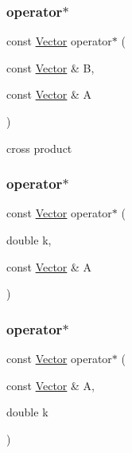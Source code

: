 \subsubsection{\texorpdfstring{operator$\ast$}{operator*}\hspace{0.1cm}{\footnotesize\ttfamily [1/3]}}
{\footnotesize\ttfamily const \hyperlink{class_p_c_a_1_1_vector}{Vector} operator$\ast$ (\begin{DoxyParamCaption}\item[{const \hyperlink{class_p_c_a_1_1_vector}{Vector} \&}]{B,  }\item[{const \hyperlink{class_p_c_a_1_1_vector}{Vector} \&}]{A }\end{DoxyParamCaption})\hspace{0.3cm}{\ttfamily [friend]}}



cross product 

\hypertarget{class_p_c_a_1_1_vector_af3d0ea67d17d9b5c985d776ed9e54bd5}{}\label{class_p_c_a_1_1_vector_af3d0ea67d17d9b5c985d776ed9e54bd5} 
\subsubsection{\texorpdfstring{operator$\ast$}{operator*}\hspace{0.1cm}{\footnotesize\ttfamily [2/3]}}
{\footnotesize\ttfamily const \hyperlink{class_p_c_a_1_1_vector}{Vector} operator$\ast$ (\begin{DoxyParamCaption}\item[{double}]{k,  }\item[{const \hyperlink{class_p_c_a_1_1_vector}{Vector} \&}]{A }\end{DoxyParamCaption})\hspace{0.3cm}{\ttfamily [friend]}}

\hypertarget{class_p_c_a_1_1_vector_a31ae6ac45e0b6192e493d884f271a0d6}{}\label{class_p_c_a_1_1_vector_a31ae6ac45e0b6192e493d884f271a0d6} 
\subsubsection{\texorpdfstring{operator$\ast$}{operator*}\hspace{0.1cm}{\footnotesize\ttfamily [3/3]}}
{\footnotesize\ttfamily const \hyperlink{class_p_c_a_1_1_vector}{Vector} operator$\ast$ (\begin{DoxyParamCaption}\item[{const \hyperlink{class_p_c_a_1_1_vector}{Vector} \&}]{A,  }\item[{double}]{k }\end{DoxyParamCaption})\hspace{0.3cm}{\ttfamily [friend]}}

